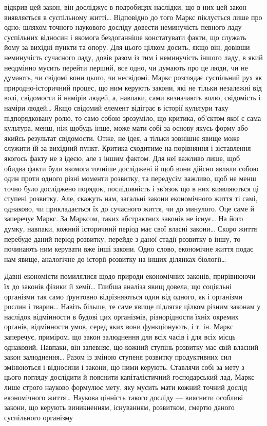 \parcont{}  %
відкрив цей закон, він досліджує в подробицях наслідки, що в
них цей закон виявляється в суспільному житті\dots{} Відповідно до
того Маркс піклується лише про одно: шляхом точного наукового
досліду довести неминучість певного ладу суспільних відносин
і якомога бездоганніше констатувати факти, що служать йому
за вихідні пункти та опору. Для цього цілком досить, якщо він,
довівши неминучість сучасного ладу, довів разом із тим і неминучість
іншого ладу, в який неодмінно мусить перейти перший, все
одно, чи думають про це люди, чи не думають, чи свідомі вони
цього, чи несвідомі. Маркс розглядає суспільний рух як природно-історичний
процес, що ним керують закони, які не тільки незалежні
від волі, свідомости й намірів людей, а, навпаки, сами
визначають волю, свідомість і наміри людей\dots{} Якщо свідомий
елемент відіграє в історії культури таку підпорядковану ролю,
то само собою зрозуміло, що критика, об’єктом якої є сама культура,
менш, ніж щобудь інше, може мати собі за основу якусь форму
або якийсь результат свідомости. Отже, не ідея, а тільки зовнішнє
явище може служити їй за вихідний пункт. Критика сходитиме
на порівняння і зіставлення якогось факту не з ідеєю, але з іншим
фактом. Для неї важливо лише, щоб обидва факти були якомога
точніше досліджені й щоб вони дійсно являли собою один проти
одного різні моменти розвитку, та передусім важливо, щоб не
менш точно було досліджено порядок, послідовність і зв’язок
що в них виявляються ці ступені розвитку. Але, скажуть нам,
загальні закони економічного життя ті самі, однаково, чи
прикладається їх до сучасного життя, чи до минулого. Оце саме
й заперечує Маркс. За Марксом, таких абстрактних законів не
існує\dots{} На його думку, навпаки, кожний історичний період має
свої власні закони\dots{} Скоро життя перебуде даний період розвитку,
перейде з даної стадії розвитку в іншу, то починають ним керувати
вже інші закони. Одно слово, економічне життя подає нам
явище, аналогічне до історії розвитку на інших ділянках біології\dots{}

Давні економісти помилялися щодо природи економічних законів,
прирівнюючи їх до законів фізики й хемії\dots{} Глибша аналіза
явищ довела, що соціяльні організми так само ґрунтовно відрізняються
один від одного, як і організми рослин і тварин\dots{} Навіть
більше, те саме явище підлягає цілком різним законам у наслідок
відмінности в будові цих організмів, різнорідности їхніх окремих
органів, відмінности умов, серед яких вони функціонують, і т. ін.
Маркс заперечує, приміром, що закон залюднення для всіх часів
і для всіх місць однаковий. Навпаки, він запевняє, що кожний
ступінь розвитку має свій власний закон залюднення\dots{} Разом із
зміною ступеня розвитку продуктивних сил змінюються і відносини
і закони, що ними керують. Ставлячи собі за мету з цього
погляду дослідити й пояснити капіталістичний господарський лад,
Маркс лише строго науково формулює мету, яку мусить мати
кожний точний дослід економічного життя\dots{} Наукова цінність
такого досліду — вияснити особливі закони, що керують виникненням,
існуванням, розвитком, смертю даного суспільного організму
\parbreak{}  %
